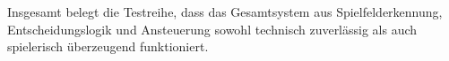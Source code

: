 Insgesamt belegt die Testreihe, dass das Gesamtsystem aus Spielfelderkennung, Entscheidungslogik und Ansteuerung sowohl technisch zuverlässig als auch spielerisch überzeugend funktioniert.




